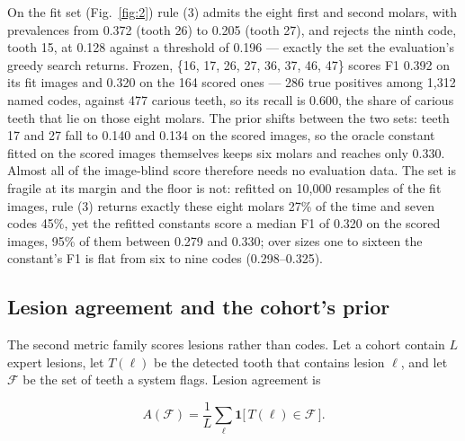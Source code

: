 \documentclass[conference]{IEEEtran}
\begin{document}
On the fit set (Fig.~\ref{fig:2}) rule (3) admits the eight first and second molars, with prevalences from 0.372 (tooth 26) to 0.205 (tooth 27), and rejects the ninth code, tooth 15, at 0.128 against a threshold of 0.196 — exactly the set the evaluation's greedy search returns. Frozen, \{16, 17, 26, 27, 36, 37, 46, 47\} scores F1 0.392 on its fit images and 0.320 on the 164 scored ones — 286 true positives among 1,312 named codes, against 477 carious teeth, so its recall is 0.600, the share of carious teeth that lie on those eight molars. The prior shifts between the two sets: teeth 17 and 27 fall to 0.140 and 0.134 on the scored images, so the oracle constant fitted on the scored images themselves keeps six molars and reaches only 0.330. Almost all of the image-blind score therefore needs no evaluation data. The set is fragile at its margin and the floor is not: refitted on 10,000 resamples of the fit images, rule (3) returns exactly these eight molars 27\% of the time and seven codes 45\%, yet the refitted constants score a median F1 of 0.320 on the scored images, 95\% of them between 0.279 and 0.330; over sizes one to sixteen the constant's F1 is flat from six to nine codes (0.298–0.325).

\subsection{Lesion agreement and the cohort's prior}

The second metric family scores lesions rather than codes. Let a cohort contain $L$ expert lesions, let $T(\ell)$ be the detected tooth that contains lesion $\ell$, and let $\mathcal{F}$ be the set of teeth a system flags. Lesion agreement is

\begin{equation}
A(\mathcal{F}) = \frac{1}{L} \sum_{\ell} \mathbf{1}\big[\, T(\ell) \in \mathcal{F} \,\big].
\end{equation}
\end{document}
